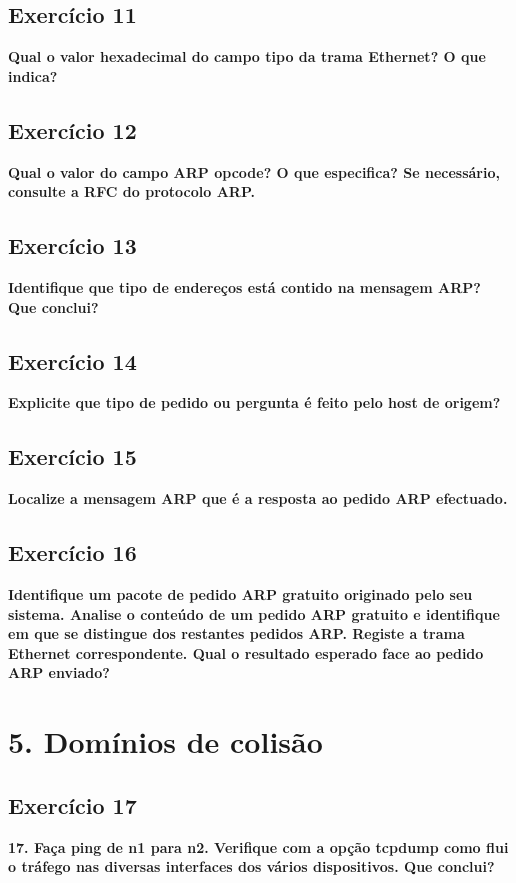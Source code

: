 \documentclass[a4paper]{report}
\begin{document}
\section{Exercício 11}
\textbf{Qual o valor hexadecimal do campo tipo da trama Ethernet? O que indica?}


\section{Exercício 12}
\textbf{Qual o valor do campo ARP opcode? O que especifica?  Se necessário,
consulte a RFC do protocolo ARP.}


\section{Exercício 13}
\textbf{Identifique que tipo de endereços está contido na mensagem ARP? Que
conclui?}


\section{Exercício 14}
\textbf{Explicite que tipo de pedido ou pergunta é feito pelo host de origem?}


\section{Exercício 15}
\textbf{Localize a mensagem ARP que é a resposta ao pedido ARP efectuado.}


\section{Exercício 16}
\textbf{Identifique um pacote de pedido ARP gratuito originado pelo seu sistema.
Analise o conteúdo de um pedido ARP gratuito e identifique em que se distingue
dos restantes pedidos ARP. Registe a trama Ethernet correspondente. Qual o
resultado esperado face ao pedido ARP enviado?}


\chapter{5. Domínios de colisão}
\section{Exercício 17}
\textbf{17. Faça ping de n1 para n2. Verifique com a opção tcpdump como flui o
tráfego nas diversas interfaces dos vários dispositivos. Que conclui?}
\end{document}
